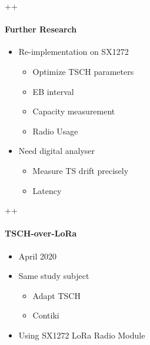 \begin{frame}{++}
\framesubtitle{Further Research}
\begin{itemize}
  \item Re-implementation on SX1272
  \begin{itemize}
    \item Optimize TSCH parameters
    \item EB interval
    \item Capacity measurement
    \item Radio Usage
  \end{itemize}
  \item Need digital analyser
  \begin{itemize}
    \item Measure TS drift precisely
    \item Latency
  \end{itemize}
\end{itemize}
\end{frame}

\begin{frame}{++}
\framesubtitle{TSCH-over-LoRa}

\begin{itemize}
  \item April 2020
  \item Same study subject
  \begin{itemize}
    \item Adapt TSCH
    \item Contiki
  \end{itemize}
  \item Using SX1272 LoRa Radio Module
\end{itemize}

\end{frame}

